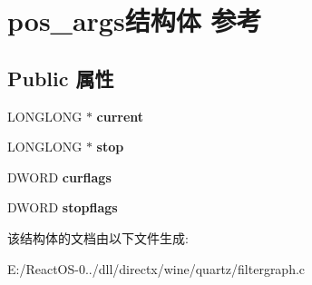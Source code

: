 \hypertarget{structpos__args}{}\section{pos\+\_\+args结构体 参考}
\label{structpos__args}
\subsection*{Public 属性}
\begin{DoxyCompactItemize}
\item 
\mbox{\label{structpos__args_ac349a52b0d73cd890df356948e563b78}} 
L\+O\+N\+G\+L\+O\+NG $\ast$ {\bfseries current}
\item 
\mbox{\label{structpos__args_a3273725d7ffa586c32c660d4dee3c459}} 
L\+O\+N\+G\+L\+O\+NG $\ast$ {\bfseries stop}
\item 
\mbox{\label{structpos__args_a090a4b7379e2b650c1737083edf73ddf}} 
D\+W\+O\+RD {\bfseries curflags}
\item 
\mbox{\label{structpos__args_ab5d9a3242b6786ad7df1693a38eb7401}} 
D\+W\+O\+RD {\bfseries stopflags}
\end{DoxyCompactItemize}


该结构体的文档由以下文件生成\+:\begin{DoxyCompactItemize}
\item 
E\+:/\+React\+O\+S-\/0../dll/directx/wine/quartz/filtergraph.\+c\end{DoxyCompactItemize}
